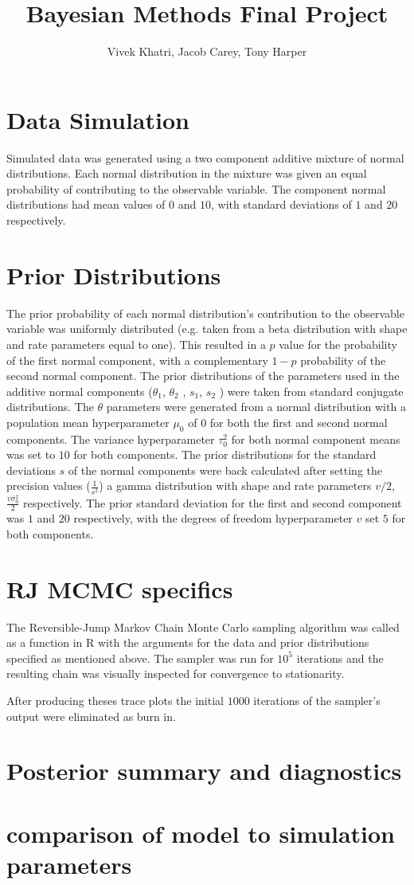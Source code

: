 \documentclass[12pt]{article}
\title{Bayesian Methods Final Project}
\author{Vivek Khatri, Jacob Carey, Tony Harper}
\date{}
\begin{document}
\section*{Data Simulation}
Simulated data was generated using a two component additive mixture of normal distributions.  Each normal distribution in the mixture was given an equal probability of contributing to the observable variable. The component normal distributions had mean values of $0$ and $10$, with standard deviations of $1$ and $20$ respectively.

\section*{Prior Distributions}
The prior probability of each normal distribution’s contribution to the observable variable was uniformly distributed (e.g. taken from a beta distribution with shape and rate parameters equal to one). This resulted in a $p$ value for the probability of the first normal component, with a complementary $1-p$ probability of the second normal component.
The prior distributions of the parameters used in the additive normal components ($\theta_1$, $\theta_2$ , $s_1$, $s_2$ ) were taken from standard conjugate distributions. The $\theta$ parameters were generated from a normal distribution with a population mean hyperparameter $\mu_0$ of $0$ for both the first and second normal components. The variance hyperparameter $\tau_0^2$ for both normal component means was set to $10$ for both components.
	The prior distributions for the standard deviations $s$ of the normal components were back calculated after setting the precision values ($\frac{1}{s^2}$)  a gamma distribution with shape and rate parameters $v/2$, $\frac{v\sigma_0^2}{2}$ respectively. The prior standard deviation for the first and second component  was $1$ and $20$ respectively, with the degrees of freedom hyperparameter $v$ set $5$ for both components. 

\section*{RJ MCMC specifics}
The Reversible-Jump Markov Chain Monte Carlo sampling algorithm was called as a function in R with the arguments for the data and prior distributions specified as mentioned above. The sampler was run for $10^5$ iterations and the resulting chain was visually inspected for convergence to stationarity.


After producing theses trace plots the initial $1000$ iterations of the sampler's output were eliminated as burn in.

\section*{Posterior summary and diagnostics}

\section*{comparison of model to simulation parameters}
\end{document}
